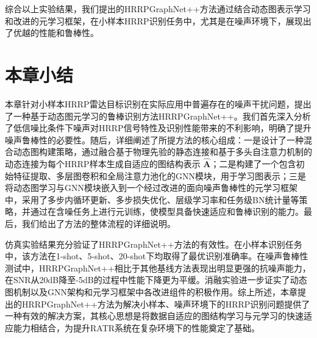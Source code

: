 综合以上实验结果，我们提出的HRRPGraphNet++方法通过结合动态图表示学习和改进的元学习框架，在小样本HRRP识别任务中，尤其是在噪声环境下，展现出了优越的性能和鲁棒性。

\section{本章小结}
\label{sec:noise_summary}

本章针对小样本HRRP雷达目标识别在实际应用中普遍存在的噪声干扰问题，提出了一种基于动态图元学习的鲁棒识别方法HRRPGraphNet++。我们首先深入分析了低信噪比条件下噪声对HRRP信号特性及识别性能带来的不利影响，明确了提升噪声鲁棒性的必要性。随后，详细阐述了所提方法的核心组成：一是设计了一种混合动态图构建策略，通过融合基于物理先验的静态连接和基于多头自注意力机制的动态连接为每个HRRP样本生成自适应的图结构表示 $\hat{\mathbf{A}}$；二是构建了一个包含初始特征提取、多层图卷积和全局注意力池化的GNN模块，用于学习图表示；三是将动态图学习与GNN模块嵌入到一个经过改进的面向噪声鲁棒性的元学习框架中，采用了多步内循环更新、多步损失优化、层级学习率和任务级BN统计量等策略，并通过在含噪任务上进行元训练，使模型具备快速适应和鲁棒识别的能力。最后，我们给出了方法的整体流程的详细说明。

仿真实验结果充分验证了HRRPGraphNet++方法的有效性。在小样本识别任务中，该方法在1-shot、5-shot、20-shot下均取得了最优识别准确率。在噪声鲁棒性测试中，HRRPGraphNet++相比于其他基线方法表现出明显更强的抗噪声能力，在SNR从20dB降至-5dB的过程中性能下降更为平缓。消融实验进一步证实了动态图机制以及GNN架构和元学习框架中各改进组件的积极作用。综上所述，本章提出的HRRPGraphNet++方法为解决小样本、噪声环境下的HRRP识别问题提供了一种有效的解决方案，其核心思想是将数据自适应的图结构学习与元学习的快速适应能力相结合，为提升RATR系统在复杂环境下的性能奠定了基础。
